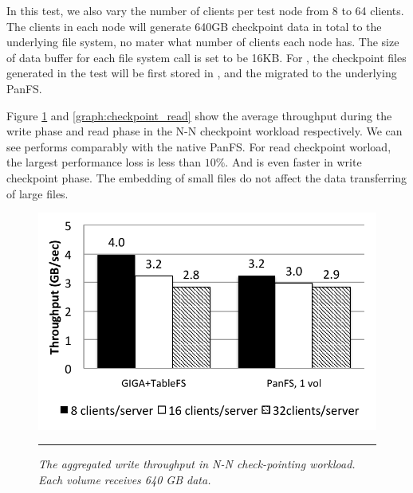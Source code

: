 In this test, we also vary the number of clients per test node
from 8 to 64 clients. The clients in each node will generate
640GB checkpoint data in total to the underlying file system,
no mater what number of clients each node has.
The size of data buffer for each file system call is set to be 16KB.
For \sys, the checkpoint files generated in the test will be
first stored in \tfs, and the migrated to the underlying PanFS.

Figure \ref{graph:checkpoint_write} and \ref{graph:checkpoint_read}
show the average throughput during the write phase and read phase
in the N-N checkpoint workload respectively. We can see \sys
performs comparably with the native PanFS.
For read checkpoint worload, the largest performance loss is less than $10\%$.
And \sys is even faster in write checkpoint phase.
The embedding of small files do not affect the data transferring
of large files.

\begin{figure}[t]  %
\centerline{\includegraphics[scale=0.7]{./figs/checkpointing_write}}
\vspace{10pt}
\caption{\normalsize
\textit{
The aggregated write throughput in N-N check-pointing workload.
Each volume receives 640 GB data.
}
}
\vspace{10pt}
\hrule
\label{graph:checkpoint_write}
\end{figure}       %

